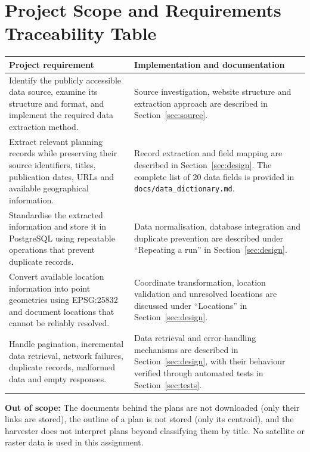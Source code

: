 \documentclass[11pt,a4paper]{article}
\renewcommand{\arraystretch}{1.2}
\begin{document}
\section{Project Scope and Requirements Traceability Table}
\begin{table}[H]
	\centering
	\label{tab:requirements_mapping}
	
	\renewcommand{\arraystretch}{1.8}
	\setlength{\tabcolsep}{8pt}
	
	\begin{tabularx}{\textwidth}{
			@{}
			>{\raggedright\arraybackslash}p{}
			>{\raggedright\arraybackslash}X
			@{}
		}
		\toprule
		\textbf{Project requirement} &
		\textbf{Implementation and documentation} \\
		\midrule
		
		Identify the publicly accessible data source, examine its
		structure and format, and implement the required data
		extraction method.
		&
		Source investigation, website structure and extraction
		approach are described in Section~\ref{sec:source}. \\
		Extract relevant planning records while preserving their
		source identifiers, titles, publication dates, URLs and
		available geographical information.
		&
		Record extraction and field mapping are described in
		Section~\ref{sec:design}. The complete list of 20 data
		fields is provided in \texttt{docs/data\_dictionary.md}. \\
		Standardise the extracted information and store it in
		PostgreSQL using repeatable operations that prevent
		duplicate records.
		&
		Data normalisation, database integration and
		duplicate prevention are described under
		``Repeating a run'' in Section~\ref{sec:design}. \\
		Convert available location information into point
		geometries using EPSG:25832 and document locations
		that cannot be reliably resolved.
		&
		Coordinate transformation, location validation and
		unresolved locations are discussed under
		``Locations'' in Section~\ref{sec:design}. \\
		Handle pagination, incremental data retrieval,
		network failures, duplicate records, malformed data
		and empty responses.
		&
		Data retrieval and error-handling mechanisms are
		described in Section~\ref{sec:design}, with their
		behaviour verified through automated tests in
		Section~\ref{sec:tests}. \\
		\bottomrule
	\end{tabularx}
\end{table}
%
\textbf{Out of scope:} The documents behind the plans are not downloaded (only their links are stored), the outline of a
plan is not stored (only its centroid), and the harvester does not interpret plans beyond classifying them by title.
No satellite or raster data is used in this assignment.
\end{document}
